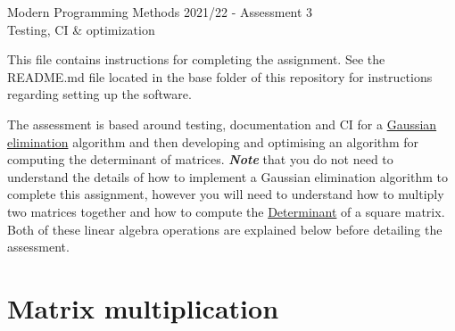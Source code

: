 \documentclass[a4paper,11pt]{article}
\begin{document}
\begin{center}
\LARGE{Modern Programming Methods 2021/22 - Assessment 3}\\
\vspace{0.5cm}
\LARGE{Testing, CI \& optimization}\\
\end{center}
\vspace{1.5cm}
%
This file contains instructions for completing the assignment. See the \newline
README.md file located in the base folder of this repository for instructions
regarding setting up the software.

The assessment is based around testing, documentation and CI for a
\href{https://en.wikipedia.org/wiki/Gaussian\_elimination}{Gaussian elimination} algorithm
and then developing and optimising an algorithm for computing the determinant of matrices.
\textit{\textbf{Note}} that you do not need to understand the details of how to implement
a Gaussian elimination algorithm to complete this assignment, however you will need
to understand how to multiply two matrices together and how to compute the
\href{https://en.wikipedia.org/wiki/Determinant}{Determinant} of a square matrix.
Both of these linear algebra operations are explained below before detailing the
assessment.

\section*{Matrix multiplication}
\end{document}
